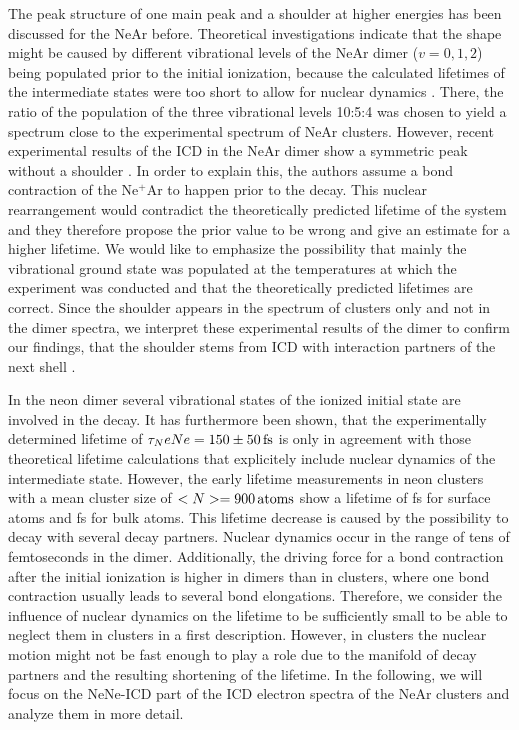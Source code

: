 The peak structure of one main peak and a shoulder at higher energies has been
discussed for the NeAr before. Theoretical investigations indicate that the
shape might be caused by different vibrational levels of the NeAr dimer
($v=0,1,2$) being populated prior to the initial ionization, because
the calculated lifetimes of the intermediate states were too short to allow
for nuclear dynamics \cite{Scheit06}.
There, the ratio of the population of the three vibrational levels 10:5:4
was chosen to yield a spectrum close to the experimental spectrum of NeAr
clusters.
However,
recent experimental results of the ICD in the NeAr dimer show a symmetric peak
without a shoulder \cite{OKeeffe14}. In order to explain this, the authors assume
a bond contraction of the Ne$^+$Ar to happen prior to the decay.
This nuclear rearrangement would contradict the
theoretically predicted lifetime of the system and they therefore propose
the prior value to be wrong and give an estimate for a higher lifetime.
We would like to emphasize the possibility that mainly the vibrational
ground state was populated at the temperatures at which the
experiment was conducted and that the theoretically predicted lifetimes are
correct.
Since the shoulder appears in the spectrum of clusters only and not in the
dimer spectra, we interpret these experimental results of the dimer to confirm our
findings, that the shoulder stems from ICD with interaction partners of the
next shell \cite{Fasshauer14_1}.

In the neon dimer several vibrational states of the ionized initial state are
involved in the decay. \cite{Santra00_1} It has furthermore been shown, that
the experimentally determined lifetime of $\tau_NeNe=\unit[150\pm 50]{fs}$
\cite{Schnorr13} is only in agreement with those theoretical lifetime
calculations that explicitely include nuclear dynamics of the intermediate state.
\cite{Schnorr15} However, the early lifetime measurements in neon clusters with
a mean cluster size of $<N>=\unit[900]{atoms}$ show a lifetime of
\unit[30]{fs} for surface atoms and \unit[6]{fs} for bulk atoms. This lifetime
decrease is caused by the possibility to decay with several decay partners.
Nuclear dynamics occur in the range of tens of femtoseconds in the dimer.
Additionally, the driving force for a bond contraction after the initial
ionization is higher in dimers than in clusters, where one bond contraction
usually leads to several bond elongations. Therefore, we consider the influence
of nuclear dynamics on the lifetime to be sufficiently small to be able to
neglect them in clusters in a first description.
\cite{Santra01_3,Ohrwall04}
However, in clusters the nuclear
motion might not be fast enough to play a role due to the manifold of
decay partners and the resulting shortening of the lifetime.
In the following, we will focus on the NeNe-ICD part of the
ICD electron spectra of the NeAr clusters and analyze them in more detail.


